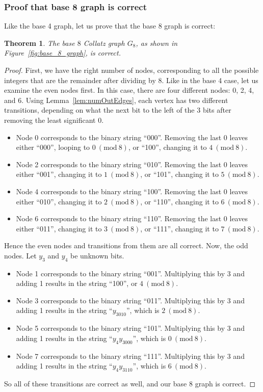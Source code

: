 \documentclass[12pt]{article}
\newcommand{\Mod}[1]{\ (\mathrm{mod}\ #1)}
\newtheorem{theorem}{Theorem}[section]
\theoremstyle{definition}
\begin{document}
\subsubsection{Proof that base 8 graph is correct} \label{subsubsec:base8proof}
Like the base 4 graph, let us prove that the base 8 graph is correct:
\begin{theorem}
The base $8$ Collatz graph $G_8$, as shown in Figure~\ref{fig:base_8_graph}, is correct.
\end{theorem}
\begin{proof}
First, we have the right number of nodes, corresponding to all the possible integers that are the remainder after dividing by 8. Like in the base 4 case, let us examine the even nodes first. In this case, there are four different nodes: 0, 2, 4, and 6. Using Lemma~\ref{lem:numOutEdges}, each vertex has two different transitions, depending on what the next bit to the left of the 3 bits after removing the least significant 0. 
\begin{itemize}
    \item Node 0 corresponds to the binary string ``000''. Removing the last 0 leaves either ``000'', looping to $0\Mod{8}$, or ``100'', changing it to $4\Mod{8}$.
    \item Node 2 corresponds to the binary string ``010''. Removing the last 0 leaves either ``001'', changing it to $1\Mod{8}$, or ``101'', changing it to $5\Mod{8}$.
    \item Node 4 corresponds to the binary string ``100''. Removing the last 0 leaves either ``010'', changing it to $2\Mod{8}$, or ``110'', changing it to $6\Mod{8}$.
    \item Node 6 corresponds to the binary string ``110''. Removing the last 0 leaves either ``011'', changing it to $3\Mod{8}$, or ``111'', changing it to $7\Mod{8}$.
\end{itemize}
Hence the even nodes and transitions from them are all correct. Now, the odd nodes. Let $y_3$ and $y_4$ be unknown bits.
\begin{itemize}
    \item Node 1 corresponds to the binary string ``001''. Multiplying this by 3 and adding 1 results in the string ``100'', or $4\Mod{8}$.
    \item Node 3 corresponds to the binary string ``011''. Multiplying this by 3 and adding 1 results in the string ``$y_3010$'', which is $2\Mod{8}$.
    \item Node 5 corresponds to the binary string ``101''. Multiplying this by 3 and adding 1 results in the string ``$y_4y_3000$'', which is $0\Mod{8}$.
    \item Node 7 corresponds to the binary string ``111''. Multiplying this by 3 and adding 1 results in the string ``$y_4y_3110$'', which is $6\Mod{8}$.
\end{itemize}
So all of these transitions are correct as well, and our base 8 graph is correct.
\end{proof}
\end{document}
